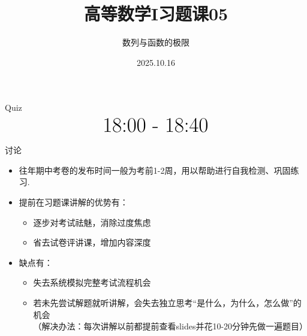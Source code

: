 \documentclass[]{beamer}
\title{高等数学I\quad 习题课05}
\subtitle{数列与函数的极限}
\date[2025.10.16]{2025.10.16}
\author[上海科技大学]{}
\institute[]{上海科技大学}
\begin{document}
\begin{frame}
    \vspace{15pt}
    \titlepage
\end{frame}

\begin{frame}{Quiz}
    \[
    \text{\Huge 18:00 - 18:40}
    \]
\end{frame}


\begin{frame}{讨论}
    \begin{itemize}
        \item 往年期中考卷的发布时间一般为考前1-2周，用以帮助进行自我检测、巩固练习.
        \item 提前在习题课讲解的优势有：
        \begin{itemize}
            \item 逐步对考试祛魅，消除过度焦虑
            \item 省去试卷评讲课，增加内容深度
        \end{itemize}
        \item 缺点有：
        \begin{itemize}
            \item 失去系统模拟完整考试流程机会
            \item 若未先尝试解题就听讲解，会失去独立思考“是什么，为什么，怎么做”的机会
            \\（解决办法：每次讲解以前都提前查看slides并花10-20分钟先做一遍题目）
        \end{itemize}
    \end{itemize}
\end{frame}

\end{document}
